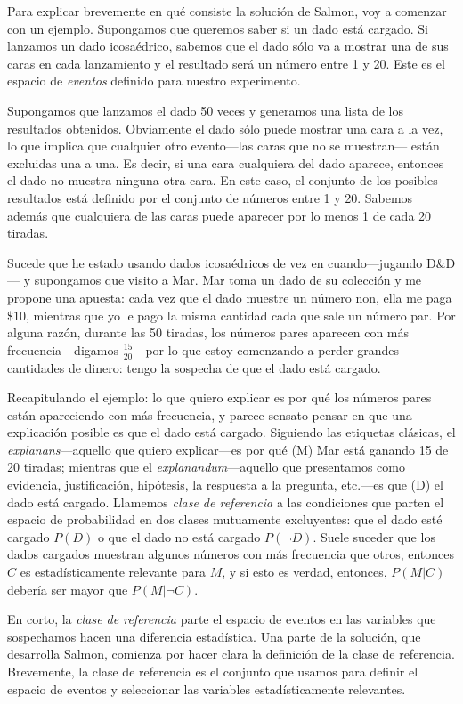 Para explicar brevemente en qué consiste la solución de
Salmon, voy a comenzar con un ejemplo. Supongamos que
queremos saber si un dado está cargado. Si lanzamos un dado
icosaédrico, sabemos que el dado sólo va a mostrar una de sus caras en
cada lanzamiento y el resultado será un número entre 1 y 20.
Este es el espacio de \emph{eventos} definido para nuestro
experimento.

Supongamos que lanzamos el dado 50 veces y generamos una
lista de los resultados obtenidos. Obviamente el dado sólo
puede mostrar una cara a la vez, lo que implica que
cualquier otro evento---las caras que no se muestran---
están excluidas una a una. Es decir, si una cara cualquiera
del dado aparece, entonces el dado no muestra ninguna otra
cara. En este caso, el conjunto de los posibles resultados
está definido por el conjunto de números entre 1 y 20.
Sabemos además que cualquiera de las caras puede aparecer
por lo menos 1 de cada 20 tiradas.

Sucede que he estado usando dados icosaédricos de vez en
cuando---jugando D\&D--- y supongamos que visito a Mar. Mar
toma un dado de su colección y me propone una apuesta: cada
vez que el dado muestre un número non, ella me paga $ \$10
$, mientras que yo le pago la misma cantidad cada que sale
un número par. Por alguna razón, durante las 50 tiradas, los
números pares aparecen con más frecuencia---digamos $
\frac{15}{20} $---por lo que estoy comenzando a perder
grandes cantidades de dinero: tengo la sospecha de que el
dado está cargado.

Recapitulando el ejemplo: lo que quiero explicar es por qué
los números pares están apareciendo con más frecuencia, y
parece sensato pensar en que una explicación posible es que
el dado está cargado. Siguiendo las etiquetas clásicas, el
\emph{explanans}---aquello que quiero explicar---es por qué
(M) Mar está ganando 15 de 20 tiradas; mientras que el 
\emph{explanandum}---aquello que presentamos como evidencia,
justificación, hipótesis, la respuesta a la pregunta, 
etc.---es que (D) el dado está cargado. Llamemos \emph{clase
de referencia} a las condiciones que parten el espacio de
probabilidad en dos clases mutuamente excluyentes: que el
dado esté cargado $P(D) $ o que el dado no está cargado 
$P(\neg D)$. Suele suceder que los dados cargados muestran
algunos números con más frecuencia que otros, entonces $ C $
es estadísticamente relevante para $ M $, y si esto es
verdad, entonces, $ P( M | C ) $ debería ser mayor que $ P(M 
| \neg C ) $.

En corto, la \emph{clase de referencia} parte el espacio de
eventos en las variables que sospechamos hacen una
diferencia estadística. Una parte de la solución, que
desarrolla Salmon, comienza por hacer clara la definición de
la clase de referencia. Brevemente, la clase de referencia
es el conjunto que usamos para definir el espacio de eventos
y seleccionar las variables estadísticamente relevantes.

